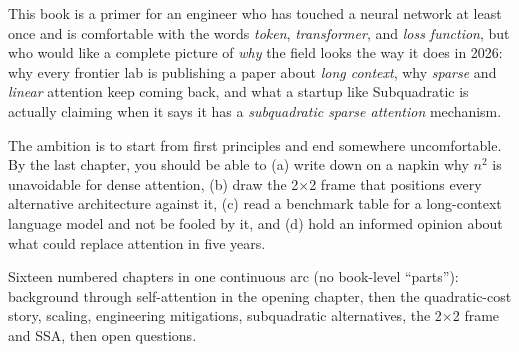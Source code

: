 
This book is a primer for an engineer who has touched a neural network at least
once and is comfortable with the words \emph{token}, \emph{transformer}, and
\emph{loss function}, but who would like a complete picture of \emph{why} the
field looks the way it does in 2026: why every frontier lab is publishing a
paper about \emph{long context}, why \emph{sparse} and \emph{linear} attention
keep coming back, and what a startup like Subquadratic is actually claiming
when it says it has a \emph{subquadratic sparse attention} mechanism.

The ambition is to start from first principles and end somewhere uncomfortable.
By the last chapter, you should be able to (a) write down on a napkin why
\(n^2\) is unavoidable for dense attention, (b) draw the 2$\times$2 frame that
positions every alternative architecture against it, (c) read a benchmark table
for a long-context language model and not be fooled by it, and (d) hold an
informed opinion about what could replace attention in five years.

 Sixteen numbered chapters in one continuous arc
(no book-level ``parts''): background through self-attention in the opening chapter, then the quadratic-cost story, scaling, engineering
mitigations, subquadratic alternatives, the 2$\times$2 frame and SSA, then
open questions.


